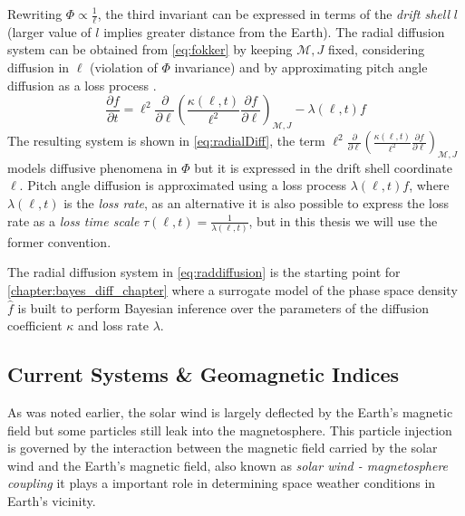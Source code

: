 Rewriting $\Phi \propto \frac{1}{\ell}$, the third invariant can be expressed in terms of the 
\emph{drift shell} $l$ (larger value of $l$ implies greater distance from the Earth). The radial 
diffusion system can be obtained from \cref{eq:fokker} by keeping $\mathcal{M}, J$ fixed, 
considering diffusion in $\ell$ (violation of $\Phi$ invariance) and by approximating pitch angle 
diffusion as a loss process \citep{roederer2012dynamics,Walt1970}.  
%
\begin{equation}\label{eq:radialDiff}
    \frac{\partial{f}}{\partial{t}} = \ell^2 \frac{\partial}{\partial{\ell}} \left( \frac{\kappa(\ell,
        t)}{\ell^{2}} \frac{\partial{f}}{\partial{\ell}}
    \right)_{\mathcal{M}, J} - \lambda(\ell,t) f
\end{equation}
%
The resulting system is shown in \cref{eq:radialDiff}, the term 
$\ell^2 \frac{\partial}{\partial{\ell}} \left( \frac{\kappa(\ell,t)}{\ell^{2}} 
\frac{\partial{f}}{\partial{\ell}}\right)_{\mathcal{M}, J}$ models diffusive phenomena in $\Phi$ 
but it is expressed in the drift shell coordinate $\ell$. Pitch angle diffusion is approximated 
using a loss process $\lambda(\ell,t) f$, where $\lambda(\ell,t)$ is the \emph{loss rate}, as an 
alternative it is also possible to express the loss rate as a \emph{loss time scale} 
$\tau(\ell,t) = \frac{1}{\lambda(\ell,t)}$, but in this thesis we will use the former convention.

The radial diffusion system in \cref{eq:raddiffusion} is the starting point for 
\cref{chapter:bayes_diff_chapter} where a surrogate model of the phase space density $\hat{f}$ is 
built to perform Bayesian inference over the parameters of the diffusion coefficient $\kappa$ and 
loss rate $\lambda$.

\subsection{Current Systems \& Geomagnetic Indices}\label{sec:geoindex}

As was noted earlier, the solar wind is largely deflected by the Earth's magnetic field but some 
particles still leak into the magnetosphere. This particle injection is governed by the interaction 
between the magnetic field carried by the solar wind and the Earth's magnetic field, also known as 
\emph{solar wind - magnetosphere coupling} it plays a important role in determining space weather 
conditions in Earth's vicinity. 

